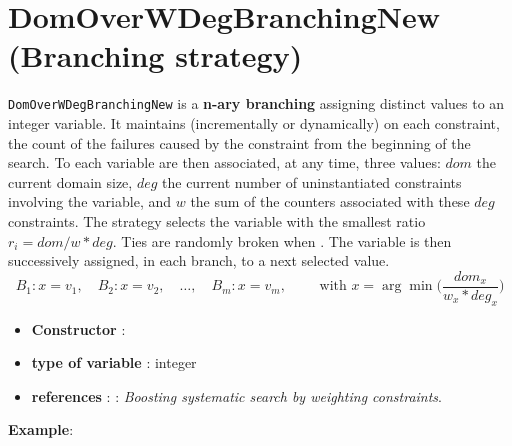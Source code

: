 \section{DomOverWDegBranchingNew (Branching strategy)}\label{domoverwdeg:domoverwdegbranchstrat}\hypertarget{domoverwdeg:domoverwdegbranchstrat}{}
\begin{notedef}
  \texttt{DomOverWDegBranchingNew} is a \textbf{n-ary branching} assigning distinct values to an integer variable. It maintains (incrementally or dynamically) on each constraint, the count of the failures caused by the constraint from the beginning of the search.
To each variable are then associated, at any time, three values: $dom$ the current domain size, $deg$ the current number of uninstantiated constraints involving the variable, and $w$ the sum of the counters associated with these $deg$ constraints.
The strategy selects the variable with the smallest ratio $r_i=dom/w*deg$.  Ties are randomly broken when .
The variable is then successively assigned, in each branch, to a next selected value.
$$B_1: x=v_1,\quad B_2: x= v_2,\quad\ldots,\quad B_m: x= v_m,\qquad\text{ with } x=\arg\min\bigl(\frac{dom_x}{w_x*deg_x}\bigr)$$
\end{notedef}

\begin{itemize}
	\item \textbf{Constructor} :
	\item \textbf{type of variable} : integer
	\item \textbf{references} : \cite{Boussemart04}: \emph{Boosting systematic search by weighting constraints}.
\end{itemize}

\textbf{Example}:
%

